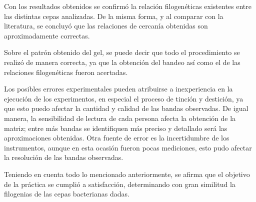 \documentclass[%
 reprint,
 amsmath,amssymb,
 aps,
showkeys,
letter,
12pts
]{revtex4-1}
\begin{document}
	Con los resultados obtenidos se confirmó la relación filogenéticas existentes entre las distintas cepas analizadas. De la misma forma, y al comparar con la literatura, se concluyó que las relaciones de cercanía obtenidas son aproximadamente correctas.
	
	Sobre el patrón obtenido del gel, se puede decir que todo el procedimiento se realizó de manera correcta, ya que la obtención del bandeo así como el de las relaciones filogenéticas fueron acertadas.
	
	Los posibles errores experimentales pueden atribuirse a inexperiencia en la ejecución de los experimentos, en especial el proceso de tinción y destición, ya que esto puedo afectar la cantidad y calidad de las bandas observadas. De igual manera, la sensibilidad de lectura de cada persona afecta la obtención de la matriz; entre más bandas se identifiquen más preciso y detallado será las aproximaciones obtenidas. Otra fuente de error es la incertidumbre de los instrumentos, aunque en esta ocasión fueron pocas mediciones, esto pudo afectar la resolución de las bandas observadas.
	
	Teniendo en cuenta todo lo mencionado anteriormente, se afirma que el objetivo de la práctica se cumplió a satisfacción, determinando con gran similitud la filogenias de las cepas bacterianas dadas.	
	
	
	



\end{document}
